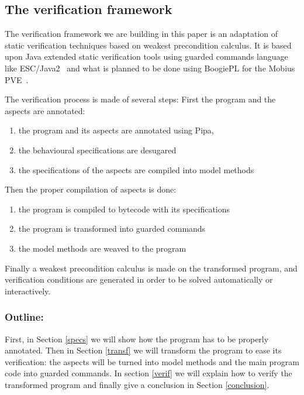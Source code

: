\subsection{The verification framework}
\label{framework}
The verification framework we are building in this paper is an
adaptation of static verification techniques based on weakest
precondition calculus. It is based upon Java extended static verification
tools using guarded commands language like ESC/Java2~\cite{CokK04} and
what is planned to be done using BoogiePL for the Mobius
PVE~\cite{MobiusPVE07}.


The verification process is made of several steps:
First the program and the aspects are annotated:
\begin{enumerate}
\item the program and its aspects are annotated using Pipa,
\item the behavioural specifications are desugared
\item the specifications of the aspects are compiled into model
methods
\end{enumerate}
Then the proper compilation of aspects is done:
\begin{enumerate}
\item the program is compiled to bytecode with its specifications
\item the program is transformed into guarded commands
\item the model methods are weaved to the program
\end{enumerate}
Finally a weakest precondition calculus is made on the transformed
program, and verification conditions are generated in order to be
solved automatically or interactively.

\subsubsection{Outline:}
First, in Section \ref{specs} we will show how the program has to be
 properly annotated. Then in Section \ref{transf} we will
transform the program to ease its verification: the aspects will be turned
into model methods and the main program code into guarded commands.
In section \ref{verif} we will explain how to verify the transformed program
and finally give a conclusion in Section \ref{conclusion}.

